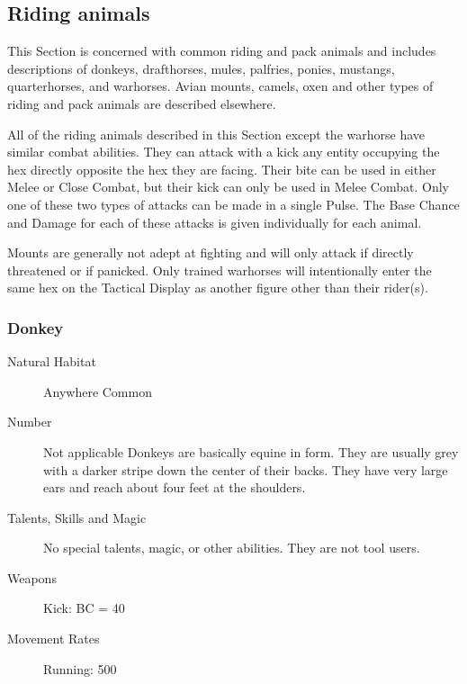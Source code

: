 \begin{multicols}{2}

\setlength\columnseprule{0.2mm}

\section{Riding animals}
This Section is concerned with common riding and pack animals and
includes descriptions of donkeys, drafthorses, mules, palfries,
ponies, mustangs, quarterhorses, and warhorses.  Avian mounts, camels,
oxen and other types of riding and pack animals are described
elsewhere.

All of the riding animals described in this Section except the
warhorse have similar combat abilities.  They can attack with a kick
any entity occupying the hex directly opposite the hex they are
facing.  Their bite can be used in either Melee or Close Combat, but
their kick can only be used in Melee Combat.  Only one of these two
types of attacks can be made in a single Pulse.  The Base Chance and
Damage for each of these attacks is given individually for each
animal.

Mounts are generally not adept at fighting and will only attack if
directly threatened or if panicked.  Only trained warhorses will
intentionally enter the same hex on the Tactical Display as another
figure other than their rider(s).

\subsubsection{Donkey}

\begin{description}
\item[Natural Habitat]  Anywhere Common

\item[Number] Not applicable
 Donkeys are basically equine in form. They are usually
grey with a darker stripe down the center of their backs.  They have
very large ears and reach about four feet at the shoulders.

\item[Talents, Skills and Magic] No special talents, magic, or other abilities. They are not
tool users.

\item[Weapons] Kick: BC = 40%

\item[Movement Rates]  Running: 500


\end{description}
\end{multicols}
